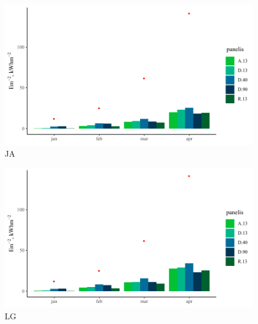 \begin{figure}[h]
    \centering
    \includegraphics[width=\linewidth]{figures/results/ja_m2.pdf}
    \caption{JA}
    \label{fig:ja}
\end{figure}



\begin{figure}[h]
    \centering
    \includegraphics[width=\linewidth]{figures/results/lg_m2.pdf}
    \caption{LG}
    \label{fig:lg}
\end{figure}

